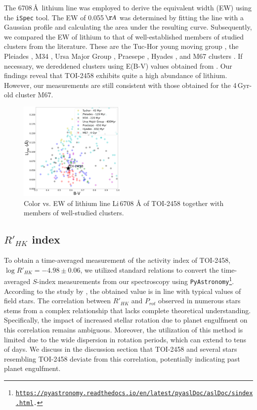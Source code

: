 \documentclass[traditabstract,longauth]{aa}
\begin{document}
The 6708\,\AA\ lithium line was employed to derive the equivalent width (EW) using the {\tt iSpec} tool. The EW of 0.055\,$\AA$ was determined by fitting the line with a Gaussian profile and calculating the area under the resulting curve. Subsequently, we compared the EW of lithium to that of well-established members of studied clusters from the literature. These are the Tuc-Hor young moving group \citep[$\sim$45 Myr;][]{Mentuch08}, the Pleiades \citep[$\sim$120 Myr;][]{Soderblom93}, M34 \citep[$\sim$220 Myr;][]{Jones97}, Ursa Major Group \citep[$\sim$400 Myr;][]{Soderblom1993}, Praesepe \citep[$\sim$650 Myr;][]{Soderblom993}, Hyades \citep[$\sim$650 Myr;][]{Soderblom90}, and M67 clusters \citep[$\sim$4 Gyr;][]{Jones99}. If necessary, we dereddened clusters using E(B-V) values obtained from \citet{Gaia2018}. Our findings reveal that TOI-2458 exhibits quite a high abundance of lithium. However, our measurements are still consistent with those obtained for the 4\,Gyr-old cluster M67.

\begin{figure}
\centering
\includegraphics[width=0.46\textwidth, trim= {0.0cm 0.0cm 0.0cm 0.0cm}]{figures/lithium_v2.png}
\caption{Color vs. EW of lithium line Li\,6708 \AA{} of TOI-2458 together with members of well-studied clusters.} \label{fig:litium}
\end{figure}

\subsection{$R'_{HK}$ index}

To obtain a time-averaged measurement of the activity index of TOI-2458, $\log R'_{HK} = -4.98 \pm 0.06$, we utilized standard relations to convert the time-averaged $S$-index measurements from our spectroscopy \citep{Noyes84,Mittag13} using {\tt PyAstronomy\footnote{\url{https://pyastronomy.readthedocs.io/en/latest/pyaslDoc/aslDoc/sindex.html}.}}. According to the study by \citet{Mamajek:2008}, the obtained value is in line with typical values of field stars. The correlation between $R'_{HK}$ and $P_{rot}$ observed in numerous stars \citep[e.g.,][]{Lovis11,Mascareno15} stems from a complex relationship that lacks complete theoretical understanding. Specifically, the impact of increased stellar rotation due to planet engulfment on this correlation remains ambiguous. Moreover, the utilization of this method is limited due to the wide dispersion in rotation periods, which can extend to tens of days. We discuss in the discussion section that TOI-2458 and several stars resembling TOI-2458 deviate from this correlation, potentially indicating past planet engulfment.
\end{document}
